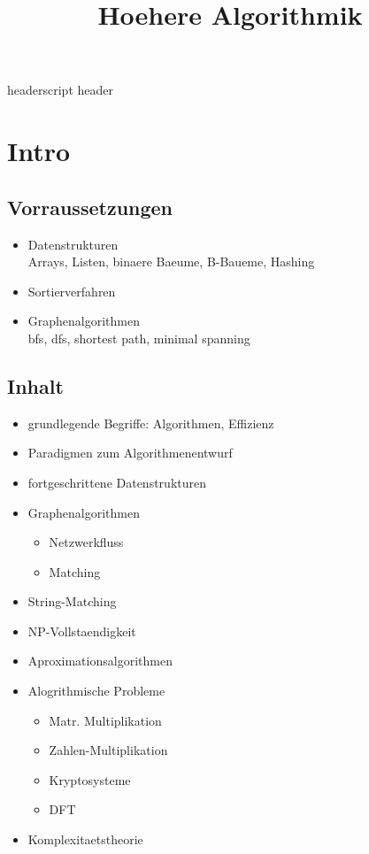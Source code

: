  {headerscript}
 {header}


\title{Hoehere Algorithmik}
\maketitle

\tableofcontents

\chapter{Intro}
\section{Vorraussetzungen}
\begin{itemize}
\item Datenstrukturen\\
	Arrays, Listen, binaere Baeume, B-Baueme, Hashing
\item Sortierverfahren\\
\item Graphenalgorithmen\\
	bfs, dfs, shortest path, minimal spanning
\end{itemize}

\section{Inhalt}
\begin{itemize}
\item grundlegende Begriffe: Algorithmen, Effizienz
\item Paradigmen zum Algorithmenentwurf
\item fortgeschrittene Datenstrukturen
\item Graphenalgorithmen 
	\begin{itemize}
	\item Netzwerkfluss
	\item Matching
	\end{itemize}
\item String-Matching
\item NP-Vollstaendigkeit
\item Aproximationsalgorithmen
\item Alogrithmische Probleme
	\begin{itemize}
	\item Matr. Multiplikation
	\item Zahlen-Multiplikation
	\item Kryptosysteme
	\item DFT
	\end{itemize}
\item Komplexitaetstheorie
\end{itemize}





